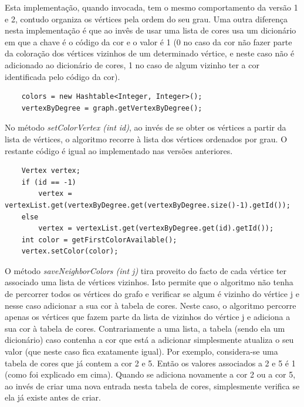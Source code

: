 \documentclass[a4paper,10pt]{report}
\begin{document}
Esta implementação, quando invocada, tem o mesmo comportamento da versão 1 e 2, contudo organiza os vértices pela ordem do seu grau. Uma outra diferença nesta implementação é que ao invês de usar uma lista de cores usa um dicionário em que a chave é o código da cor e o valor é 1 (0 no caso da cor não fazer parte da coloração dos vértices vizinhos de um determinado vértice, e neste caso não é adicionado ao dicionário de cores, 1 no caso de algum vizinho ter a cor identificada pelo código da cor).

\begin{lstlisting}
    colors = new Hashtable<Integer, Integer>();
    vertexByDegree = graph.getVertexByDegree();
\end{lstlisting}

No método \textit{setColorVertex (int id)}, ao invés de se obter os vértices a partir da lista de vértices, o algoritmo recorre à lista dos vértices ordenados por grau. O restante código é igual ao implementado nas versões anteriores.

\begin{lstlisting}
    Vertex vertex;
    if (id == -1)   
        vertex = vertexList.get(vertexByDegree.get(vertexByDegree.size()-1).getId());
    else
        vertex = vertexList.get(vertexByDegree.get(id).getId());
    int color = getFirstColorAvailable();
    vertex.setColor(color);
\end{lstlisting}

O método \textit{saveNeighborColors (int j)} tira proveito do facto de cada vértice ter associado uma lista de vértices vizinhos. Isto permite que o algoritmo não tenha de percorrer todos os vértices do grafo e verificar se algum é vizinho do vértice j e nesse caso adicionar a sua cor à tabela de cores. Neste caso, o algoritmo percorre apenas os vértices que fazem parte da lista de vizinhos do vértice j e adiciona a sua cor à tabela de cores.
Contrariamente a uma lista, a tabela (sendo ela um dicionário) caso contenha a cor que está a adicionar simplesmente atualiza o seu valor (que neste caso fica exatamente igual). Por exemplo, considera-se uma tabela de cores que já contem a cor 2 e 5. Então os valores associados a 2 e 5 é 1 (como foi explicado em cima). Quando se adiciona novamente a cor 2 ou a cor 5, ao invés de criar uma nova entrada nesta tabela de cores, simplesmente verifica se ela já existe antes de criar.
\end{document}
